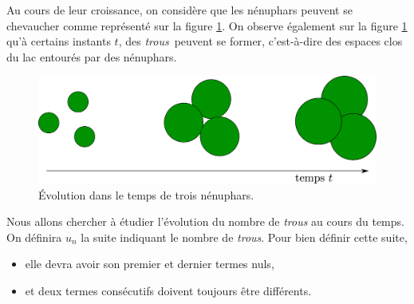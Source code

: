 \documentclass{../ficheTDTP}
\begin{document}
	Au cours de leur croissance, on considère que les nénuphars peuvent se chevaucher comme représenté sur la figure \ref{fig1}. On observe également sur la figure \ref{fig1} qu'à certains instants $t$, des \og \textit{trous}\fg\ peuvent se former, c'est-à-dire des espaces clos du lac entourés par des nénuphars.

	\begin{figure}[h]
	\begin{center}
            \includegraphics[width=12cm]{nenuphar.eps}
        \end{center}
	\vspace{-5mm}
	\caption{Évolution dans le temps de trois nénuphars.}\label{fig1}
\end{figure}

	Nous allons chercher à étudier l'évolution du nombre de \textit{trous} au cours du temps. On définira $u_n$ la suite indiquant le nombre de \textit{trous}. Pour bien définir cette suite, \begin{itemize}
\item elle devra avoir son premier et dernier termes nuls,
\item et deux termes consécutifs doivent toujours être différents.\\
\end{itemize}
\end{document}
